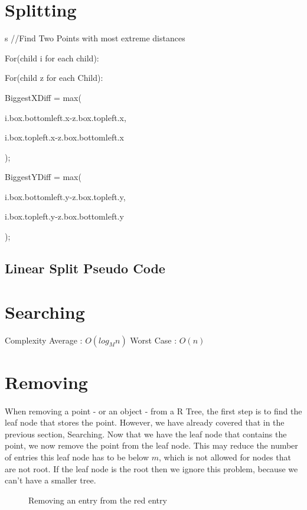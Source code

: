 \documentclass{article}
\begin{document}
\section{Splitting} 
\begin{flushleft}s
//Find Two Points with most extreme distances

For(child i for each child):

\quad For(child z for each Child):

    \quad \quad BiggestXDiff = max(

    \quad \quad \quad     i.box.bottomleft.x-z.box.topleft.x,

    \quad \quad \quad     i.box.topleft.x-z.box.bottomleft.x

    \quad \quad     );

    \quad \quad BiggestYDiff = max(

    \quad \quad \quad     i.box.bottomleft.y-z.box.topleft.y,

    \quad \quad \quad     i.box.topleft.y-z.box.bottomleft.y

    \quad \quad     );

    \quad\quad 

\subsection*{Linear Split Pseudo Code}



\end{flushleft}

\section{Searching}
Complexity
Average : $O(log_Mn)$
Worst Case : $O(n)$

\section{Removing}
\paragraph{}
When removing a point - or an object - from a R Tree, the first step is to find the leaf node that stores the point.
However, we have already covered that in the previous section, Searching. Now that we have the leaf node that contains
the point, we now remove the point from the leaf node. This may reduce the number of entries this leaf node has to be below
$m$, which is not allowed for nodes that are not root. If the leaf node is the root then we ignore this problem, because
we can't have a smaller tree.\\
\begin{figure}
\caption{Removing an entry from the red entry}
\centering
\label{fig:removing}
\end{figure}
\end{document}
